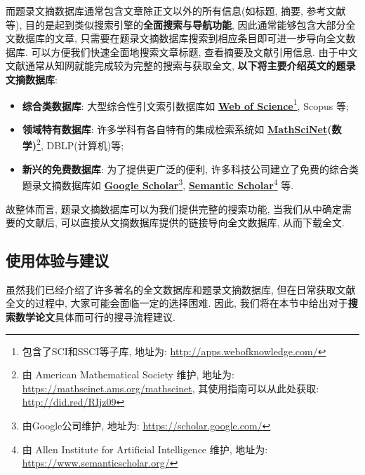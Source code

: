 \documentclass{formatBook}
\begin{document}
而题录文摘数据库通常包含文章除正文以外的所有信息(如标题, 摘要, 参考文献等), 目的是起到类似搜索引擎的\textbf{全面搜索与导航功能}, 因此通常能够包含大部分全文数据库的文章,  只需要在题录文摘数据库搜索到相应条目即可进一步导向全文数据库. 可以方便我们快速全面地搜索文章标题, 查看摘要及文献引用信息. 由于中文文献通常从知网就能完成较为完整的搜索与获取全文, \textbf{以下将主要介绍英文的题录文摘数据库}:
\begin{itemize}
    \item \textbf{综合类数据库}: 大型综合性引文索引数据库如 \textbf{\href{http://apps.webofknowledge.com/}{Web of Science}}\footnote{包含了SCI和SSCI等子库, 地址为: \url{http://apps.webofknowledge.com/}}, Scopus 等;
    \item \textbf{领域特有数据库}: 许多学科有各自特有的集成检索系统如 \textbf{\href{https://mathscinet.ams.org/mathscinet}{MathSciNet}(数学)}\footnote{由 American Mathematical Society 维护, 地址为: \url{https://mathscinet.ams.org/mathscinet}, 其使用指南可以从此处获取: \url{http://did.red/RIjz09}}, DBLP(计算机)等;
    \item \textbf{新兴的免费数据库}: 为了提供更广泛的便利, 许多科技公司建立了免费的综合类题录文摘数据库如 \textbf{\href{https://scholar.google.com/}{Google Scholar}}\footnote{由Google公司维护, 地址为: \url{https://scholar.google.com/}}, \textbf{\href{https://www.semanticscholar.org/}{Semantic Scholar}}\footnote{由 Allen Institute for Artificial Intelligence 维护, 地址为: \url{https://www.semanticscholar.org/}} 等.
\end{itemize}

故整体而言, 题录文摘数据库可以为我们提供完整的搜索功能, 当我们从中确定需要的文献后, 可以直接从文摘数据库提供的链接导向全文数据库, 从而下载全文. 

\subsection{使用体验与建议}
虽然我们已经介绍了许多著名的全文数据库和题录文摘数据库, 但在日常获取文献全文的过程中, 大家可能会面临一定的选择困难. 因此, 我们将在本节中给出对于\textbf{搜索数学论文}具体而可行的搜寻流程建议.
\end{document}
